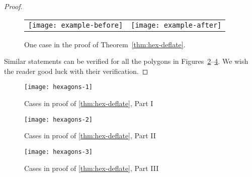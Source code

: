 \documentclass{article}
\begin{document}
\begin{proof}
\begin{figure}
  \begin{center}
    \begin{tabular}{cc}
      \texttt{[image: example-before]} &
      \texttt{[image: example-after]} 
    \end{tabular}
  \end{center}
  \caption{One case in the proof of Theorem~\ref{thm:hex-deflate}.}
  \label{fig:example}
\end{figure}

Similar statements can be verified for all the polygons in
Figures~\ref{fig:hexagons-a}--\ref{fig:hexagons-c}.  We wish the reader
good luck with their verification.
\end{proof}

\begin{figure}
  \begin{center}
    \texttt{[image: hexagons-1]}
  \end{center}
  \caption{Cases in proof of \ref{thm:hex-deflate}, Part I}
  \label{fig:hexagons-a}
\end{figure}

\begin{figure}
  \begin{center}
    \texttt{[image: hexagons-2]}
  \end{center}
  \caption{Cases in proof of \ref{thm:hex-deflate}, Part II}
  \label{fig:hexagons-b}
\end{figure}

\begin{figure}
  \begin{center}
    \texttt{[image: hexagons-3]}
  \end{center}
  \caption{Cases in proof of \ref{thm:hex-deflate}, Part III}
  \label{fig:hexagons-c}
\end{figure}
\end{document}
